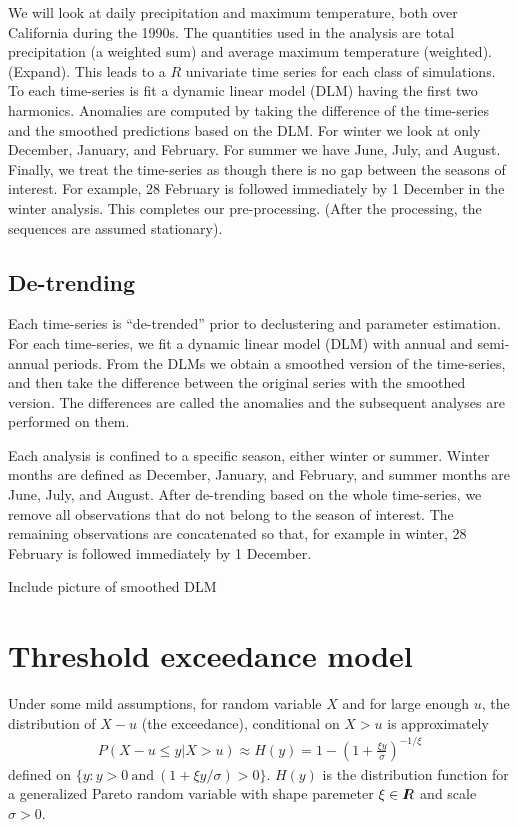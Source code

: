\documentclass[12pt]{article}
\newcommand{\R}{I\hspace{-4.4pt}R}
\newcommand{\R}{I\hspace{-4.4pt}R}
\begin{document}
We will look at daily precipitation and maximum temperature, both over California during the 1990s. The quantities used in the analysis are total precipitation (a weighted sum) and average maximum temperature (weighted). (Expand). This leads to a $R$ univariate time series for each class of simulations. To each time-series is fit a dynamic linear model (DLM) having the first two harmonics. Anomalies are computed by taking the difference of the time-series and the smoothed predictions based on the DLM. For winter we look at only December, January, and February. For summer we have June, July, and August. Finally, we treat the time-series as though there is no gap between the seasons of interest. For example, 28 February is followed immediately by 1 December in the winter analysis. This completes our pre-processing. (After the processing, the sequences are assumed stationary).

\subsection{De-trending}
\label{anomaly}

Each time-series is ``de-trended'' prior to declustering and parameter estimation. For each time-series, we fit a dynamic linear model (DLM) with annual and semi-annual periods. From the DLMs we obtain a smoothed version of the time-series, and then take the difference between the original series with the smoothed version. The differences are called the anomalies and the subsequent analyses are performed on them.

Each analysis is confined to a specific season, either winter or summer. Winter months are defined as December, January, and February, and summer months are June, July, and August. After de-trending based on the whole time-series, we remove all observations that do not belong to the season of interest. The remaining observations are concatenated so that, for example in winter, 28 February is followed immediately by 1 December.

Include picture of smoothed DLM
 
\section{Threshold exceedance model}
\label{thresh}

Under some mild assumptions, for random variable $X$ and for large enough $u$, the distribution of $X-u$ (the exceedance), conditional on $X>u$ is approximately
\begin{align}
P(X-u\leq y|X>u) \approx H(y) = 1 - \left(1+\frac{\xi y}{\sigma}\right)^{-1/\xi} \label{gpapprox}
\end{align}
defined on $\{y:y>0~\mathrm{and}~(1+\xi y/\sigma) >0\}$. $H(y)$ is the distribution function for a generalized Pareto random variable with shape paremeter $\xi\in\R$ and scale $\sigma>0$.
\end{document}
